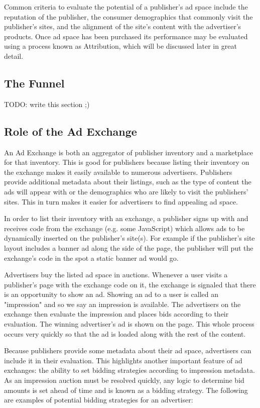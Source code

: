 \documentclass{article}
\begin{document}
Common criteria to evaluate the potential of a publisher's ad space include the reputation of the publisher, the consumer demographics that commonly visit the publisher's sites, and the alignment of the site's content with the advertiser's products. Once ad space has been purchased its performance may be evaluated using a process known as Attribution, which will be discussed later in great detail.

\subsection{The Funnel}

TODO: write this section ;)

\subsection{Role of the Ad Exchange}

An Ad Exchange is both an aggregator of publisher inventory and a marketplace for that inventory. This is good for publishers because listing their inventory on the exchange makes it easily available to numerous advertisers. Publishers provide additional metadata about their listings, such as the type of content the ads will appear with or the demographics who are likely to visit the publishers' sites. This in turn makes it easier for advertisers to find appealing ad space.

In order to list their inventory with an exchange, a publisher signs up with and receives code from the exchange (e.g. some JavaScript) which allows ads to be dynamically inserted on the publisher's site(s). For example if the publisher's site layout includes a banner ad along the side of the page, the publisher will put the exchange's code in the spot a static banner ad would go.

Advertisers buy the listed ad space in auctions. Whenever a user visits a publisher's page with the exchange code on it, the exchange is signaled that there is an opportunity to show an ad. Showing an ad to a user is called an "impression" and so we say an impression is available. The advertisers on the exchange then evaluate the impression and places bids according to their evaluation. The winning advertiser's ad is shown on the page. This whole process occurs very quickly so that the ad is loaded along with the rest of the content.

Because publishers provide some metadata about their ad space, advertisers can include it in their evaluation. This highlights another important feature of ad exchanges: the ability to set bidding strategies according to impression metadata. As an impression auction must be resolved quickly, any logic to determine bid amounts is set ahead of time and is known as a bidding strategy. The following are examples of potential bidding strategies for an advertiser:
\end{document}
